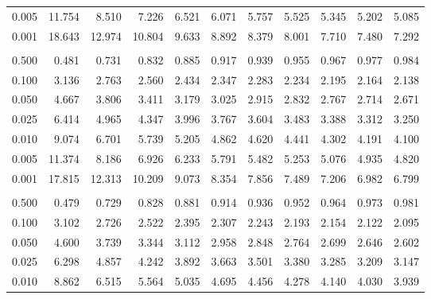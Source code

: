 \documentclass[
]{article}
\begin{document}
\begin{longtable}[t]{lrrrrrrrrrr}
\hspace{1em}0.005 & 11.754 & 8.510 & 7.226 & 6.521 & 6.071 & 5.757 & 5.525 & 5.345 & 5.202 & 5.085\\
\hspace{1em}0.001 & 18.643 & 12.974 & 10.804 & 9.633 & 8.892 & 8.379 & 8.001 & 7.710 & 7.480 & 7.292\\
\addlinespace[0.3em]
\multicolumn{11}{l}{\textbf{$k_2=13$}}\\
\hspace{1em}0.500 & 0.481 & 0.731 & 0.832 & 0.885 & 0.917 & 0.939 & 0.955 & 0.967 & 0.977 & 0.984\\
\hspace{1em}0.100 & 3.136 & 2.763 & 2.560 & 2.434 & 2.347 & 2.283 & 2.234 & 2.195 & 2.164 & 2.138\\
\hspace{1em}0.050 & 4.667 & 3.806 & 3.411 & 3.179 & 3.025 & 2.915 & 2.832 & 2.767 & 2.714 & 2.671\\
\hspace{1em}0.025 & 6.414 & 4.965 & 4.347 & 3.996 & 3.767 & 3.604 & 3.483 & 3.388 & 3.312 & 3.250\\
\hspace{1em}0.010 & 9.074 & 6.701 & 5.739 & 5.205 & 4.862 & 4.620 & 4.441 & 4.302 & 4.191 & 4.100\\
\hspace{1em}0.005 & 11.374 & 8.186 & 6.926 & 6.233 & 5.791 & 5.482 & 5.253 & 5.076 & 4.935 & 4.820\\
\hspace{1em}0.001 & 17.815 & 12.313 & 10.209 & 9.073 & 8.354 & 7.856 & 7.489 & 7.206 & 6.982 & 6.799\\
\addlinespace[0.3em]
\multicolumn{11}{l}{\textbf{$k_2=14$}}\\
\hspace{1em}0.500 & 0.479 & 0.729 & 0.828 & 0.881 & 0.914 & 0.936 & 0.952 & 0.964 & 0.973 & 0.981\\
\hspace{1em}0.100 & 3.102 & 2.726 & 2.522 & 2.395 & 2.307 & 2.243 & 2.193 & 2.154 & 2.122 & 2.095\\
\hspace{1em}0.050 & 4.600 & 3.739 & 3.344 & 3.112 & 2.958 & 2.848 & 2.764 & 2.699 & 2.646 & 2.602\\
\hspace{1em}0.025 & 6.298 & 4.857 & 4.242 & 3.892 & 3.663 & 3.501 & 3.380 & 3.285 & 3.209 & 3.147\\
\hspace{1em}0.010 & 8.862 & 6.515 & 5.564 & 5.035 & 4.695 & 4.456 & 4.278 & 4.140 & 4.030 & 3.939\\

\end{longtable}
\end{document}
